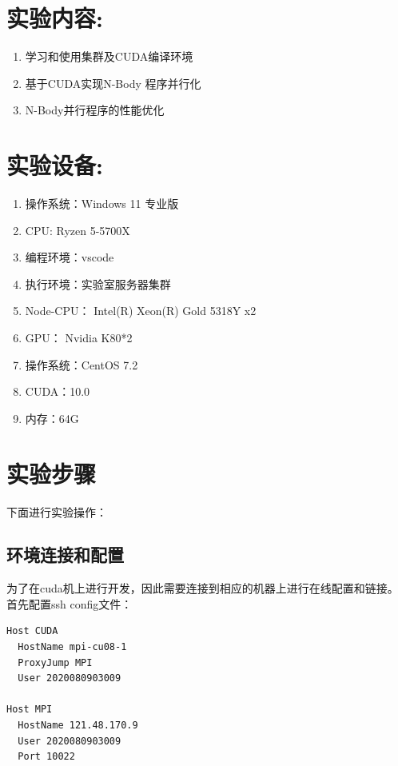 \documentclass[a4paper,11pt,UTF8]{ctexart}
\begin{document}
\section{实验内容:}

\begin{enumerate}
  \item 学习和使用集群及CUDA编译环境
  \item 基于CUDA实现N-Body 程序并行化
  \item N-Body并行程序的性能优化
  
\end{enumerate}

\section{实验设备:}

\begin{enumerate}
  \item 操作系统：Windows 11 专业版
  \item CPU: Ryzen 5-5700X
  \item 编程环境：vscode
  \item 执行环境：实验室服务器集群
  \item Node-CPU： Intel(R) Xeon(R) Gold 5318Y x2
  \item GPU： Nvidia K80*2
  \item 操作系统：CentOS 7.2
  \item CUDA：10.0
  \item 内存：64G
  
\end{enumerate}
\section{实验步骤}

下面进行实验操作：
\subsection{环境连接和配置}
为了在cuda机上进行开发，因此需要连接到相应的机器上进行在线配置和链接。首先配置ssh config文件：
\begin{lstlisting}
Host CUDA
  HostName mpi-cu08-1
  ProxyJump MPI
  User 2020080903009

Host MPI
  HostName 121.48.170.9
  User 2020080903009
  Port 10022
\end{lstlisting}
\end{document}
